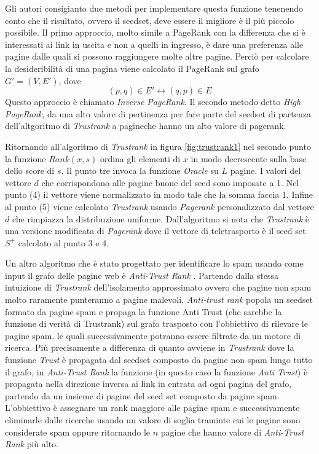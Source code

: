 Gli autori consigianto due metodi per implementare questa funzione tenenendo conto che il risultato, ovvero il seedset, deve essere il migliore è il più piccolo possibile. Il primo approccio, molto simile a PageRank con la differenza che si è  interessati ai link in uscita e non a quelli in ingresso, è dare una preferenza alle pagine dalle quali si possono raggiungere molte altre pagine. Perciò per calcolare la desideribilità di una pagina viene calcolato il PageRank sul grafo \(G'=(V,E')\), dove
\begin{equation}
 (p,q)\in E'\leftrightarrow(q,p)\in E
\end{equation}
Questo approccio è chiamato \textit{Inverse PageRank}. Il secondo metodo detto \textit{High PageRank}, da una alto valore di pertinenza per fare parte del seedset di partenza dell'altgoritmo di \textit{Trustrank} a pagineche hanno un alto valore di pagerank.

Ritornando all'algoritmo di \textit{Trustrank} in figura \ref{fig:trustrank1} nel secondo punto  la funzione \(Rank(x,s)\) ordina gli elementi di \(x\) in modo decrescente sulla base dello score di \(s\). Il punto tre invoca la funzione \textit{Oracle} su \(L\) pagine. I valori del vettore \(d\) che corrispondono alle pagine buone del seed sono imposate a 1. Nel punto (4) il vettore viene normalizzato in modo tale che la somma faccia 1. Infine al punto (5) viene calcolato \textit{Trustrank} usando \textit{Pagerank} personalizzato dal vettore \(d\) che rimpiazza la distribuzione uniforme. Dall'algoritmo si nota che \textit{Trustrank} è una versione modificata di \textit{Pagerank} dove il vettore di teletrasporto è il seed set \(S^+\) calcolato al punto 3 e 4.


Un altro algoritmo che è stato progettato per identificare lo spam usando come input il grafo delle pagine web è \textit{Anti-Trust Rank} \cite{Krishnan06webspam}. Partendo dalla stessa intuizione di \textit{Trustrank} dell'isolamento approssimato ovvero che pagine non spam molto raramente punteranno a pagine malevoli, \textit{Anti-trust rank}  popola un seedset formato da pagine spam e propaga la funzione Anti Trust (che sarebbe la funzione di verità di Trustrank) sul grafo trasposto con l’obbiettivo di rilevare le pagine spam, le quali successivamente potranno essere filtrate da un motore di ricerca. Più precisamente a differenza di quanto avviene in \textit{Trustrank} dove la funzione \textit{Trust} è propagata dal seedset composto da pagine non spam lungo tutto il grafo, in \textit{Anti-Trust Rank} la funzione (in questo caso la funzione \textit{Anti Trust}) è propagata nella direzione inversa ai link in entrata ad ogni pagina del grafo, partendo da un insieme di pagine del seed set composto da pagine 
spam. L'obbiettivo è assegnare un rank maggiore alle pagine spam e successivamente eliminarle dalle ricerche usando un valore di soglia traminte cui le pagine sono considerate spam oppure ritornando le \(n\) pagine che hanno valore di \textit{Anti-Trust Rank} più alto.
 

